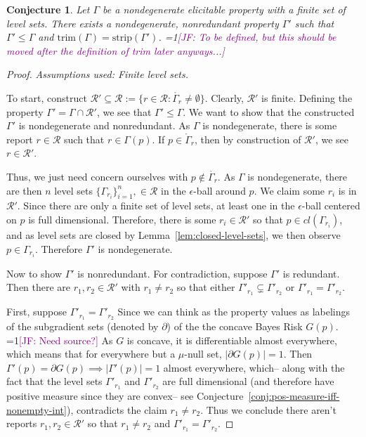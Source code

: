 \documentclass[12pt]{article}
\newcommand{\Comments}{1}
\newcommand{\mynote}[2]{\ifnum\Comments=1\textcolor{#1}{#2}\fi}
\newcommand{\jessie}[1]{\mynote{purple}{[JF: #1]}}
\newcommand{\R}{\mathcal{R}}
\newcommand{\inter}[1]{\mathring{#1}}%
\newcommand{\trim}{\mathrm{trim}}
\newcommand{\strip}{\mathrm{strip}}
\newtheorem{conjecture}{Conjecture}
\begin{document}
\begin{conjecture}\label{conj:gam-prime-exists}
	Let $\Gamma$ be a nondegenerate elicitable property with a finite set of level sets.
	There exists a nondegenerate, nonredundant property $\Gamma'$ such that $\Gamma' \leq \Gamma$ and $\trim(\Gamma) = \strip(\Gamma')$. \jessie{To be defined, but this should be moved after the definition of trim later anyways...} 
\end{conjecture}
\begin{proof}
\emph{Assumptions used: Finite level sets.}

	To start, construct $\R' \subseteq \R := \{ r \in \R : \inter{\Gamma_r} \neq \emptyset \}$.
	Clearly, $\R'$ is finite.
	Defining the property $\Gamma' = \Gamma\cap \R'$, we see that $\Gamma' \leq \Gamma$.
	We want to show that the constructed $\Gamma'$ is nondegenerate and nonredundant.
	As $\Gamma$ is nondegenerate, there is some report $r \in \R$ such that $r \in \Gamma(p)$.
	If $p \in \inter{\Gamma}_r$, then by construction of $\R'$, we see $r \in \R'$.
	
	Thus, we just need concern ourselves with $p \not \in \inter{\Gamma_r}$.
	As $\Gamma$ is nondegenerate, there are then $n$ level sets $\{\Gamma_{r_i}\}_{i=1}^n, \in \R$ in the $\epsilon$-ball around $p$.
	We claim some $r_i$ is in $\R'$.
	Since there are only a finite set of level sets, at least one in the $\epsilon$-ball centered on $p$ is full dimensional.
	Therefore, there is some $r_i \in \R'$ so that $p \in cl(\Gamma_{r_i})$, and as level sets are closed by Lemma~\ref{lem:closed-level-sets}, we then observe $p \in \Gamma_{r_i}$.
	Therefore $\Gamma'$ is nondegenerate.
	
	Now to show $\Gamma'$ is nonredundant.
	For contradiction, suppose $\Gamma'$ is redundant.
	Then there are $r_1, r_2 \in \R'$ with $r_1 \neq r_2$ so that either $\Gamma'_{r_1} \subsetneq \Gamma'_{r_2}$ or $\Gamma'_{r_1} = \Gamma'_{r_2}$.
	
	First, suppose $\Gamma'_{r_1} = \Gamma'_{r_2}$
	Since we can think as the property values as labelings of the subgradient sets (denoted by $\partial$) of the the concave Bayes Risk $G(p)$.
	\jessie{Need source?}
	As $G$ is concave, it is differentiable almost everywhere, which means that for everywhere but a $\mu$-null set, $|\partial G(p)| = 1$.
	Then $\Gamma'(p) = \partial G(p) \implies |\Gamma'(p)| = 1$ almost everywhere, which-- along with the fact that the level sets $\Gamma'_{r_1}$ and $\Gamma'_{r_2}$ are full dimensional (and therefore have positive measure since they are convex-- see Conjecture~\ref{conj:pos-measure-iff-nonempty-int}), contradicts the claim $r_1 \neq r_2$.
	Thus we conclude there aren't reports $r_1, r_2 \in \R'$ so that $r_1 \neq r_2$ and $\Gamma'_{r_1} = \Gamma'_{r_2}$.
	

\end{proof}
\end{document}
